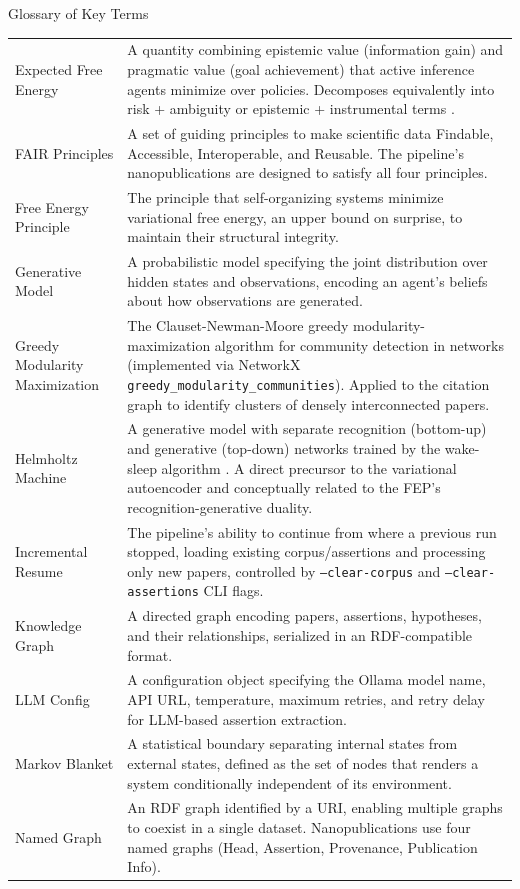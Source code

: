 \documentclass[
  ignorenonframetext,
]{beamer}
\begin{document}
\begin{frame}{Glossary of Key Terms}
\begin{longtable}{lp{12cm}}
Expected Free Energy & A quantity combining epistemic value (information gain) and pragmatic value (goal achievement) that active inference agents minimize over policies. Decomposes equivalently into risk + ambiguity or epistemic + instrumental terms \citep{dacosta2020active}. \\
FAIR Principles & A set of guiding principles to make scientific data Findable, Accessible, Interoperable, and Reusable. The pipeline's nanopublications are designed to satisfy all four principles. \\
Free Energy Principle & The principle that self-organizing systems minimize variational free energy, an upper bound on surprise, to maintain their structural integrity. \\
Generative Model & A probabilistic model specifying the joint distribution over hidden states and observations, encoding an agent's beliefs about how observations are generated. \\
Greedy Modularity Maximization & The Clauset-Newman-Moore greedy modularity-maximization algorithm for community detection in networks (implemented via NetworkX \texttt{greedy\_modularity\_communities}). Applied to the citation graph to identify clusters of densely interconnected papers. \\
Helmholtz Machine & A generative model with separate recognition (bottom-up) and generative (top-down) networks trained by the wake-sleep algorithm \citep{dayan1995helmholtz}. A direct precursor to the variational autoencoder and conceptually related to the FEP's recognition-generative duality. \\
Incremental Resume & The pipeline's ability to continue from where a previous run stopped, loading existing corpus/assertions and processing only new papers, controlled by \texttt{--clear-corpus} and \texttt{--clear-assertions} CLI flags. \\
Knowledge Graph & A directed graph encoding papers, assertions, hypotheses, and their relationships, serialized in an RDF-compatible format. \\
LLM Config & A configuration object specifying the Ollama model name, API URL, temperature, maximum retries, and retry delay for LLM-based assertion extraction. \\
Markov Blanket & A statistical boundary separating internal states from external states, defined as the set of nodes that renders a system conditionally independent of its environment. \\
Named Graph & An RDF graph identified by a URI, enabling multiple graphs to coexist in a single dataset. Nanopublications use four named graphs (Head, Assertion, Provenance, Publication Info). \\

\end{longtable}
\end{frame}
\end{document}
